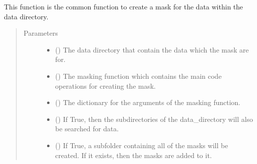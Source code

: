 \documentclass[letterpaper,10pt,english]{sphinxmanual}
\begin{document}
\begin{fulllineitems}
\label{\detokenize{docstrings/ifa_smeargle.masking.base_functions:ifa_smeargle.masking.base_functions.create_directory_mask_file}}
This function is the common function to create a mask
for the data within the data directory.
\begin{quote}\begin{description}
\item[{Parameters}] \leavevmode\begin{itemize}
\item {} 
 () \textendash{} The data directory that contain the data which the mask are
for.

\item {} 
 () \textendash{} The masking function which contains the main code operations
for creating the mask.

\item {} 
 () \textendash{} The dictionary for the arguments of the masking function.

\item {} 
 (\sphinxstyleliteralemphasis{\sphinxupquote{ (}}\sphinxstyleliteralemphasis{\sphinxupquote{)}}) \textendash{} If True, then the subdirectories of the data\_directory will
also be searched for data.

\item {} 
 (\sphinxstyleliteralemphasis{\sphinxupquote{ (}}\sphinxstyleliteralemphasis{\sphinxupquote{)}}) \textendash{} If True, a sub\sphinxhyphen{}folder containing all of the masks will be
created. If it exists, then the masks are added to it.


\end{itemize}
\end{description}
\end{quote}
\end{fulllineitems}
\end{document}
